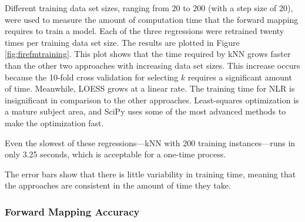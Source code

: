 Different training data set sizes, ranging from 20 to 200 (with a step size of 20), were used to measure the amount of computation time that the forward mapping requires to train a model.
Each of the three regressions were retrained twenty times per training data set size.
The results are plotted in Figure \ref{fig:firefmtraining}.
This plot shows that the time required by kNN grows faster than the other two approaches with increasing data set sizes.
This increase occurs because the 10-fold cross validation for selecting $k$ requires a significant amount of time.
Meanwhile, LOESS grows at a linear rate.
The training time for NLR is insignificant in comparison to the other approaches.
Least-squares optimization is a mature subject area, and SciPy uses some of the most advanced methods to make the optimization fast.

Even the slowest of these regressions---kNN with 200 training instances---runs in only 3.25 seconds, which is acceptable for a one-time process.


The error bars show that there is little variability in training time, meaning that the approaches are consistent in the amount of time they take.


\subsubsection{Forward Mapping Accuracy}

